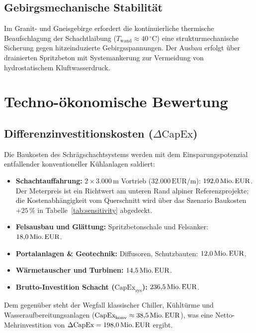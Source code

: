\documentclass[journal]{IEEEtran}
\begin{document}
\subsection{Gebirgsmechanische Stabilität}
Im Granit- und Gneisgebirge erfordert die kontinuierliche thermische Beaufschlagung der Schachtlaibung ($T_{\text{wand}} \approx 40\,^\circ\text{C}$) eine strukturmechanische Sicherung gegen hitzeinduzierte Gebirgsspannungen. Der Ausbau erfolgt über drainierten Spritzbeton mit Systemankerung zur Vermeidung von hydrostatischem Kluftwasserdruck.

\section{Techno-ökonomische Bewertung}

\subsection{Differenzinvestitionskosten ($\Delta\text{CapEx}$)}
Die Baukosten des Schrägschachtsystems werden mit dem Einsparungspotenzial entfallender konventioneller Kühlanlagen saldiert:

\begin{itemize}
    \item \textbf{Schachtauffahrung:} $2 \times 3.000\,\text{m}$ Vortrieb ($32.000\,\text{EUR/m}$): $192{,}0\,\text{Mio.\,EUR}$. Der Meterpreis ist ein Richtwert am unteren Rand alpiner Referenzprojekte; die Kostenabhängigkeit vom Querschnitt wird über das Szenario \glqq{}Baukosten $+25\,\%$\grqq{} in Tabelle~\ref{tab:sensitivity} abgedeckt.
    \item \textbf{Felsausbau und Glättung:} Spritzbetonschale und Felsanker: $18{,}0\,\text{Mio.\,EUR}$.
    \item \textbf{Portalanlagen \& Geotechnik:} Diffusoren, Schutzbauten: $12{,}0\,\text{Mio.\,EUR}$.
    \item \textbf{Wärmetauscher und Turbinen:} $14{,}5\,\text{Mio.\,EUR}$.
    \item \textbf{Brutto-Investition Schacht ($\text{CapEx}_{\text{sys}}$):} $236{,}5\,\text{Mio.\,EUR}$.
\end{itemize}

Dem gegenüber steht der Wegfall klassischer Chiller, Kühltürme und Wasseraufbereitungsanlagen ($\text{CapEx}_{\text{konv}} \approx 38{,}5\,\text{Mio.\,EUR}$), was eine Netto-Mehrinvestition von $\Delta\text{CapEx} = 198{,}0\,\text{Mio.\,EUR}$ ergibt.
\end{document}
